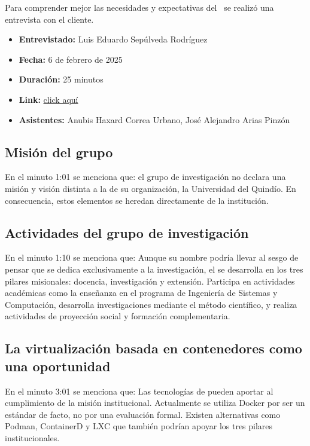 Para comprender mejor las necesidades y expectativas del \GRID\, se realizó una entrevista con el cliente.

\begin{itemize}
  \item \textbf{Entrevistado:} Luis Eduardo Sepúlveda Rodríguez
  \item \textbf{Fecha:} 6 de febrero de 2025
  \item \textbf{Duración:} 25 minutos
  \item \textbf{Link:} \href{https://drive.google.com/file/d/1rIc9xOsyDqumlTV-QXcw0inPyIbSEHLz/view?usp=sharing}{click aquí}
  \item \textbf{Asistentes:} Anubis Haxard Correa Urbano, José Alejandro Arias Pinzón
\end{itemize}

\subsection{Misión del grupo \GRID}
En el minuto 1:01 se menciona que: el grupo de investigación no declara una misión y visión distinta a la de su organización, la Universidad del Quindío. En consecuencia, estos elementos se heredan directamente de la institución.

\subsection{Actividades del grupo de investigación}
En el minuto 1:10 se menciona que: Aunque su nombre podría llevar al sesgo de pensar que se dedica exclusivamente a la investigación, el \GRID se desarrolla en los tres pilares misionales: docencia, investigación y extensión. Participa en actividades académicas como la enseñanza en el programa de Ingeniería de Sistemas y Computación, desarrolla investigaciones mediante el método científico, y realiza actividades de proyección social y formación complementaria.

\subsection{La virtualización basada en contenedores como una oportunidad}
En el minuto 3:01 se menciona que: Las tecnologías de \VBC pueden aportar al cumplimiento de la misión institucional. Actualmente se utiliza Docker por ser un estándar de facto, no por una evaluación formal. Existen alternativas como Podman, ContainerD y LXC que también podrían apoyar los tres pilares institucionales.

